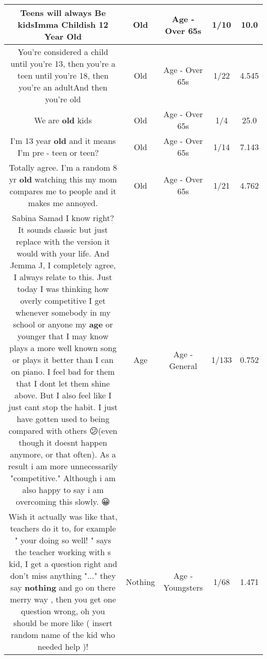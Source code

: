 \documentclass[11pt]{article}
\newlength\mylength
\begin{document}
\begin{center}
\begin{longtable}{|C{.65\mylength}|C{.30\mylength}|C{.12\mylength}|C{.12\mylength}|C{.12\mylength}|}
  \small Teens will always Be kidsImma Childish 12 Year Old\normalsize   & Old & Age - Over 65s & 1/10 & 10.0 \\  \hline
  \small You're considered a child until you're 13, then you're a teen until you're 18, then you're an adultAnd then you're old\normalsize   & Old & Age - Over 65s & 1/22 & 4.545 \\  \hline
  \small We are \textbf{old} kids\normalsize   & Old & Age - Over 65s & 1/4 & 25.0 \\  \hline
  \small I'm 13 year \textbf{old} and it means I'm pre - teen or teen? 🤔🤔🤔\normalsize   & Old & Age - Over 65s & 1/14 & 7.143 \\  \hline
  \small Totally agree. I'm a random 8 yr \textbf{old} watching this my mom compares me to people and it makes me annoyed.\normalsize   & Old & Age - Over 65s & 1/21 & 4.762 \\  \hline
  \small Sabina Samad I know right? It sounds classic but just replace with the version it would with your life. And Jemma J, I completely agree, I always relate to this. Just today I was thinking how overly competitive I get whenever somebody in my school or anyone my \textbf{age} or younger that I may know plays a more well known song or plays it better than I can on piano. I feel bad for them that I dont let them shine above. But I also feel like I just cant stop the habit. I just have gotten used to being compared with others 😕(even though it doesnt happen anymore, or that often). As a result i am more unnecessarily "competitive." Although i am also happy to say i am overcoming this slowly. 😀\normalsize   & Age & Age - General & 1/133 & 0.752 \\  \hline
  \small Wish it actually was like that, teachers do it to, for example "  your doing so well! " says the teacher working with s kid, I get a question right and don't miss anything "..." they say \textbf{nothing} and go on there merry way , then you get one question wrong, oh you should be more like ( insert random name of the kid who needed help )!\normalsize   & Nothing & Age - Youngsters & 1/68 & 1.471 \\  \hline

\end{longtable}
\end{center}
\end{document}
